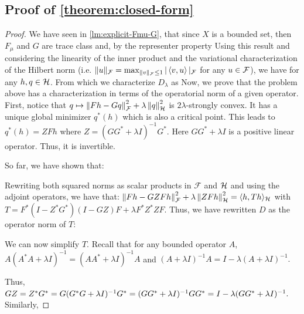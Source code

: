 \subsection{Proof of \cref{theorem:closed-form}}\label{sec:proof-closed-form}
\begin{proof}
We have seen in \cref{lm:explicit-Fmu-G}, that since $X$ is a bounded set, then $F_\mu$ and $G$ are trace class and, by the representer property
Using this result and considering the linearity of the inner product and the variational characterization of the Hilbert norm (i.e. $\|u\|_{\cal F} = \max_{\|v\|_{\cal F} \leq 1} |\left\langle{v},{u}\right\rangle|_{\cal F}$  for any $u \in {\cal F}$), we have
for any $h, q \in \mathcal H$. From which we characterize $D_\lambda$ as
Now, we prove that the problem above has a characterization in terms of the operatorial norm of a given operator.
First, notice that $q\mapsto \left\Vert{Fh - Gq}\right\Vert_\mathcal F^2 + \lambda \left\Vert{q}\right\Vert_\mathcal H^2$ is $2\lambda$-strongly convex. It has a unique global minimizer $q^*(h)$ which is also a critical point. This leads to $q^*(h) = ZFh$ where $Z = (GG^* + \lambda I)^{-1}G^*$. Here $GG^* + \lambda I$ is a positive linear operator. Thus, it is invertible.

So far, we have shown that: 

Rewriting both squared norms as scalar products in $\mathcal F$ and $\mathcal H$ and using the adjoint operators, we have that:
$\left\Vert{Fh - GZFh}\right\Vert_\mathcal F^2 + \lambda \left\Vert{ZFh}\right\Vert_\mathcal H^2 = \langle h, Th\rangle_\mathcal H$ with $T = F^*(I - Z^*G^*)(I-GZ)F + \lambda F^* Z^*ZF$. Thus, we have rewritten $D$ as the operator norm of $T$: 

We can now simplify $T$. Recall that for any bounded operator $A$, $A(A^*A + \lambda I)^{-1} = (AA^* + \lambda I)^{-1}A$ and $(A + \lambda I)^{-1}A = I - \lambda(A + \lambda I)^{-1}.$

Thus, $GZ = Z^*G^*= G(G^*G + \lambda I) ^{-1} G^*= (GG^* + \lambda I)^{-1}GG^* = I - \lambda (GG^* + \lambda I)^{-1}.$ Similarly,


\end{proof}
